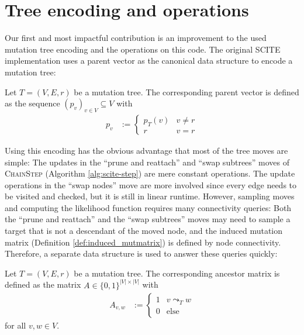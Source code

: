 \section{Tree encoding and operations}
\label{sec:encoding}

Our first and most impactful contribution is an improvement to the used mutation tree encoding and the operations on this code. The original \ac{SCITE} implementation \cite{tree2016} uses a parent vector as the canonical data structure to encode a mutation tree:

\begin{definition}
    \label{def:parent_vector}
    Let $T = (V, E, r)$ be a mutation tree. The corresponding parent vector is defined as the sequence $(p_v)_{v \in V} \subseteq V$ with
    \begin{align*}
        p_v &:= \begin{cases}
            p_T(v) & v \neq r \\
            r & v = r 
        \end{cases}
    \end{align*}
\end{definition}

Using this encoding has the obvious advantage that most of the tree moves are simple: The updates in the ``prune and reattach'' and ``swap subtrees'' moves of \textsc{ChainStep} (Algorithm \ref{alg:scite-step}) are mere constant operations. The update operations in the ``swap nodes'' move are more involved since every edge needs to be visited and checked, but it is still in linear runtime. However, sampling moves and computing the likelihood function requires many connectivity queries: Both the ``prune and reattach'' and the ``swap subtrees'' moves may need to sample a target that is not a descendant of the moved node, and the induced mutation matrix (Definition \ref{def:induced_mutmatrix}) is defined by node connectivity. Therefore, a separate data structure is used to answer these queries quickly:

\begin{definition}
    \label{def:ancestor_matrix}
    Let $T = (V, E, r)$ be a mutation tree. The corresponding ancestor matrix is defined as the matrix $A \in \{0,1\}^{|V| \times |V|}$ with
    \begin{align*}
        A_{v,w} &:= \begin{cases}
            1 & v \leadsto_T w \\
            0 & \text{else}
        \end{cases}
    \end{align*}
    for all $v, w \in V$.
\end{definition}

